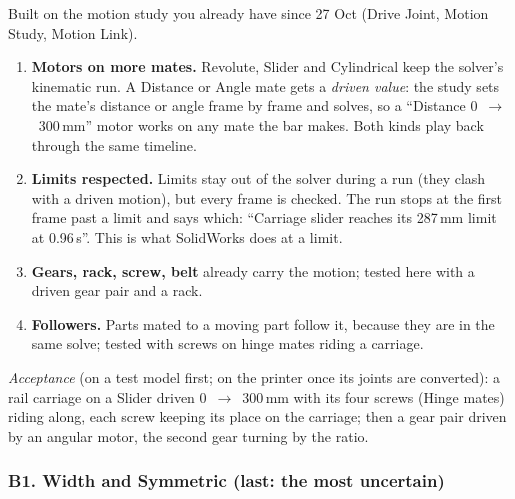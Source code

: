 Built on the motion study you already have since 27 Oct (Drive Joint, Motion Study, Motion Link).
\begin{enumerate}
  \item \textbf{Motors on more mates.} Revolute, Slider and Cylindrical keep the solver's kinematic run. A
        Distance or Angle mate gets a \emph{driven value}: the study sets the mate's distance or angle frame by
        frame and solves, so a ``Distance 0~$\rightarrow$~300\,mm'' motor works on any mate the bar makes. Both kinds
        play back through the same timeline.
  \item \textbf{Limits respected.} Limits stay out of the solver during a run (they clash with a driven motion),
        but every frame is checked. The run stops at the first frame past a limit and says which:
        ``Carriage slider reaches its 287\,mm limit at 0.96\,s''. This is what SolidWorks does at a limit.
  \item \textbf{Gears, rack, screw, belt} already carry the motion; tested here with a driven gear pair and a rack.
  \item \textbf{Followers.} Parts mated to a moving part follow it, because they are in the same solve; tested
        with screws on hinge mates riding a carriage.
\end{enumerate}
\emph{Acceptance} (on a test model first; on the printer once its joints are converted): a rail carriage on a Slider
driven 0~$\rightarrow$~300\,mm with its four screws (Hinge mates) riding along, each screw keeping its place on the
carriage; then a gear pair driven by an angular motor, the second gear turning by the ratio.

\subsubsection*{B1. Width and Symmetric (last: the most uncertain)}

